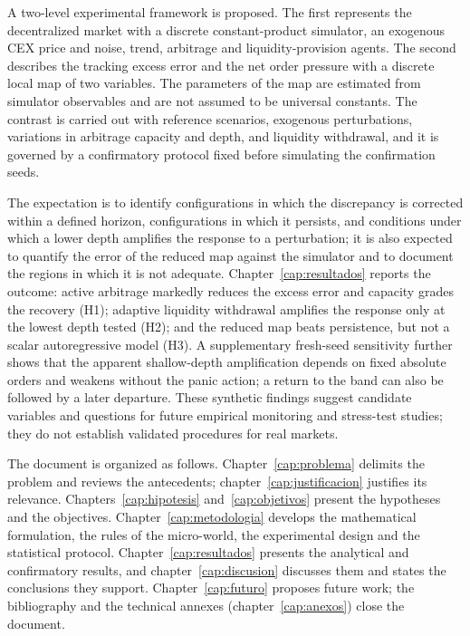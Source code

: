 A two-level experimental framework is proposed. The first represents the decentralized market with a discrete constant-product simulator, an exogenous CEX price and noise, trend, arbitrage and liquidity-provision agents. The second describes the tracking excess error and the net order pressure with a discrete local map of two variables. The parameters of the map are estimated from simulator observables and are not assumed to be universal constants. The contrast is carried out with reference scenarios, exogenous perturbations, variations in arbitrage capacity and depth, and liquidity withdrawal, and it is governed by a confirmatory protocol fixed before simulating the confirmation seeds.

The expectation is to identify configurations in which the discrepancy is corrected within a defined horizon, configurations in which it persists, and conditions under which a lower depth amplifies the response to a perturbation; it is also expected to quantify the error of the reduced map against the simulator and to document the regions in which it is not adequate. Chapter~\ref{cap:resultados} reports the outcome: active arbitrage markedly reduces the excess error and capacity grades the recovery (H1); adaptive liquidity withdrawal amplifies the response only at the lowest depth tested (H2); and the reduced map beats persistence, but not a scalar autoregressive model (H3). A supplementary fresh-seed sensitivity further shows that the apparent shallow-depth amplification depends on fixed absolute orders and weakens without the panic action; a return to the band can also be followed by a later departure. These synthetic findings suggest candidate variables and questions for future empirical monitoring and stress-test studies; they do not establish validated procedures for real markets.

The document is organized as follows. Chapter~\ref{cap:problema} delimits the problem and reviews the antecedents; chapter~\ref{cap:justificacion} justifies its relevance. Chapters~\ref{cap:hipotesis} and~\ref{cap:objetivos} present the hypotheses and the objectives. Chapter~\ref{cap:metodologia} develops the mathematical formulation, the rules of the micro-world, the experimental design and the statistical protocol. Chapter~\ref{cap:resultados} presents the analytical and confirmatory results, and chapter~\ref{cap:discusion} discusses them and states the conclusions they support. Chapter~\ref{cap:futuro} proposes future work; the bibliography and the technical annexes (chapter~\ref{cap:anexos}) close the document.
